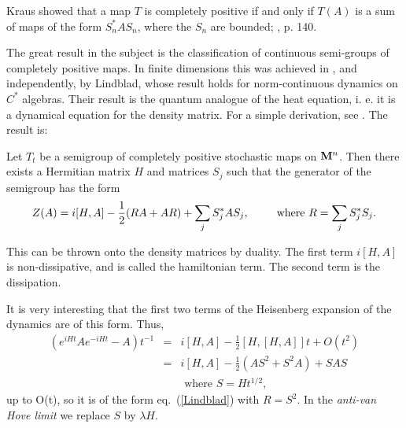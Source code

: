 Kraus showed that a map $T$ is completely positive if and only if $T(A)$
is a sum of maps of the form $S_n^*AS_n$, where the $S_n$ are bounded;
\cite{Davies}, p. 140.


The great result in the subject is the classification of continuous
semi-groups of completely positive maps. In finite dimensions this was
achieved in \cite{Gorini}, and independently, by Lindblad, \cite{Lindblad}
whose
result holds for norm-continuous dynamics on $C^*$ algebras. Their result
is the quantum analogue of the heat equation, i. e. it is a dynamical
equation for the density matrix. For a simple derivation,
see \cite{Landau2}. The result is:
\begin{theorem}
Let $T_t$ be a semigroup of completely positive stochastic maps on ${\bf
M}^n$. Then there exists a Hermitian matrix $H$ and matrices $S_j$
such that the generator of the semigroup has the form
\begin{equation}
Z(A)=i[H,A]-\frac{1}{2}(RA+AR)+\sum_jS_j^*AS_j,\hspace{.3in}\mbox{ where }R=
\sum_jS^*_jS_j.
\label{Lindblad}
\end{equation}
\end{theorem}
This can be thrown onto the density matrices by duality. The first term
$i[H,A]$ is non-dissipative, and is called the hamiltonian term.
The second term is the dissipation.

It is very interesting that the first two terms
of the Heisenberg expansion of the dynamics are of this form. Thus,
\begin{eqnarray*}
\left(e^{iHt}Ae^{-iHt}-A\right)t^{-1}&=&i[H,A]-\frac{1}{2}[H,[H,A]]t+
O(t^2)\\
&=&i[H,A]-\frac{1}{2}(AS^2+S^2A)+SAS\\
& &\mbox{ where }S=Ht^{1/2},
\end{eqnarray*}
up to O(t), so it is of the form eq.~(\ref{Lindblad}) with $R=S^2$.
In the {\em anti-van Hove limit} \cite{Streater} we replace
$S$ by $\lambda H$.

